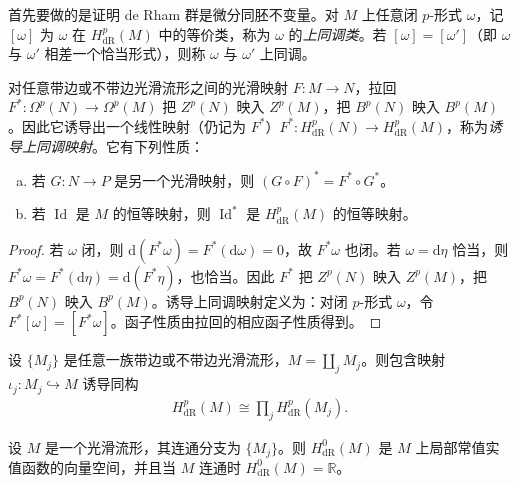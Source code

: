 \documentclass[../../main.tex]{subfiles}
\begin{document}
首先要做的是证明 de Rham 群是微分同胚不变量。对 $M$ 上任意闭 $p$-形式 $\omega$，记 $[\omega]$ 为 $\omega$ 在 $H^p_{\mathrm{dR}}(M)$ 中的等价类，称为 $\omega$ 的\emph{上同调类}。若 $[\omega]=[\omega']$（即 $\omega$ 与 $\omega'$ 相差一个恰当形式），则称 $\omega$ 与 $\omega'$ 上同调。

\begin{proposition}[诱导的上同调映射]\label{proposition:ch17-induced-cohomology-maps}
对任意带边或不带边光滑流形之间的光滑映射 $F:M\to N$，拉回 $F^*:\Omega^p(N)\to\Omega^p(M)$ 把 $Z^p(N)$ 映入 $Z^p(M)$，把 $B^p(N)$ 映入 $B^p(M)$。因此它诱导出一个线性映射（仍记为 $F^*$）$F^*:H^p_{\mathrm{dR}}(N)\to H^p_{\mathrm{dR}}(M)$，称为\emph{诱导上同调映射}。它有下列性质：
\begin{enumerate}[(a)]
\item 若 $G:N\to P$ 是另一个光滑映射，则 $(G\circ F)^*=F^*\circ G^*$。
\item 若 $\operatorname{Id}$ 是 $M$ 的恒等映射，则 $\operatorname{Id}^*$ 是 $H^p_{\mathrm{dR}}(M)$ 的恒等映射。
\end{enumerate}
\end{proposition}

\begin{proof}
若 $\omega$ 闭，则 $\mathrm{d}(F^*\omega)=F^*(\mathrm{d}\omega)=0$，故 $F^*\omega$ 也闭。若 $\omega=\mathrm{d}\eta$ 恰当，则 $F^*\omega=F^*(\mathrm{d}\eta)=\mathrm{d}(F^*\eta)$，也恰当。因此 $F^*$ 把 $Z^p(N)$ 映入 $Z^p(M)$，把 $B^p(N)$ 映入 $B^p(M)$。诱导上同调映射定义为：对闭 $p$-形式 $\omega$，令 $F^*[\omega]=[F^*\omega]$。函子性质由拉回的相应函子性质得到。
\end{proof}

\begin{proposition}\label{proposition:ch17-disjoint-union}
设 $\{M_j\}$ 是任意一族带边或不带边光滑流形，$M=\coprod_j M_j$。则包含映射 $\iota_j:M_j\hookrightarrow M$ 诱导同构
\begin{align*}
H^p_{\mathrm{dR}}(M)\cong\prod_j H^p_{\mathrm{dR}}(M_j).
\end{align*}
\end{proposition}

\begin{proposition}[连通分支上的 $0$ 次群]\label{proposition:ch17-zero-degree}
设 $M$ 是一个光滑流形，其连通分支为 $\{M_j\}$。则 $H^0_{\mathrm{dR}}(M)$ 是 $M$ 上局部常值实值函数的向量空间，并且当 $M$ 连通时 $H^0_{\mathrm{dR}}(M)=\mathbb{R}$。
\end{proposition}
\end{document}
